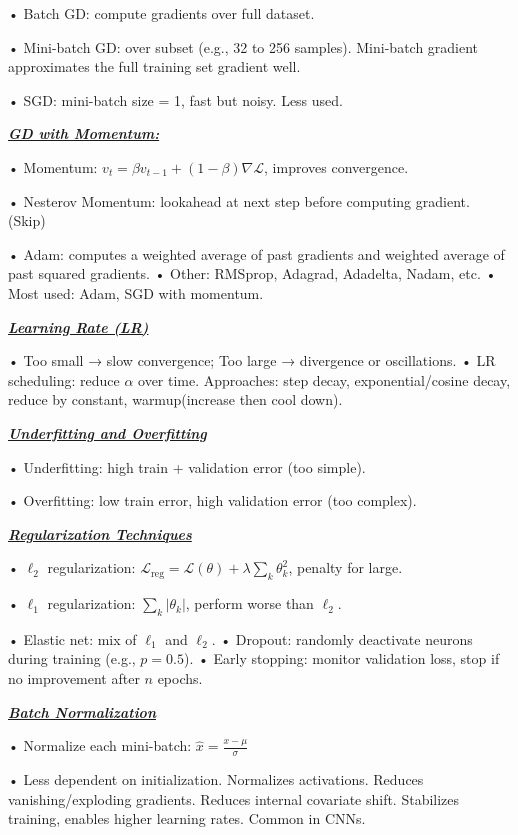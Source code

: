 \documentclass[10pt]{article}
\newcommand{\bulletPoint}[1]{\ul{\textit{\textbf{#1}}}}
\begin{document}
\begin{multicols*}{3}
• Batch GD: compute gradients over full dataset. 

• Mini-batch GD: over subset (e.g., 32 to 256 samples). Mini-batch gradient approximates the full training set gradient well.

• SGD: mini-batch size = 1, fast but noisy. Less used. 

\bulletPoint{GD with Momentum:}

• Momentum: $v_t = \beta v_{t-1} + (1-\beta) \nabla \mathcal{L}$, improves convergence. \quad

• Nesterov Momentum: lookahead at next step before computing gradient. (Skip)

• Adam: computes a weighted average of past gradients and weighted average of past squared gradients. 
• Other: RMSprop, Adagrad, Adadelta, Nadam, etc. 
• Most used: Adam, SGD with momentum.

\bulletPoint{Learning Rate (LR)} 

• Too small → slow convergence; Too large → divergence or oscillations. 
• LR scheduling: reduce $\alpha$ over time. 
Approaches: step decay, exponential/cosine decay, reduce by constant, warmup(increase then cool down).

\bulletPoint{Underfitting and Overfitting} 

• Underfitting: high train + validation error (too simple). 

• Overfitting: low train error, high validation error (too complex). 

\bulletPoint{Regularization Techniques} \quad

• $\ell_2$ regularization: $\mathcal{L}_{\text{reg}} = \mathcal{L}(\theta) + \lambda \sum_k \theta_k^2$, penalty for large.

• $\ell_1$ regularization: $\sum_k |\theta_k|$, perform worse than $\ell_2$. \quad

• Elastic net: mix of $\ell_1$ and $\ell_2$. \quad
• Dropout: randomly deactivate neurons during training (e.g., $p=0.5$). \quad
• Early stopping: monitor validation loss, stop if no improvement after $n$ epochs.

\bulletPoint{Batch Normalization} \quad

• Normalize each mini-batch: $\hat{x} = \frac{x - \mu}{\sigma}$ \quad

• Less dependent on initialization. Normalizes activations. Reduces vanishing/exploding gradients. Reduces internal covariate shift.
Stabilizes training, enables higher learning rates. Common in CNNs.


\end{multicols*}
\end{document}
